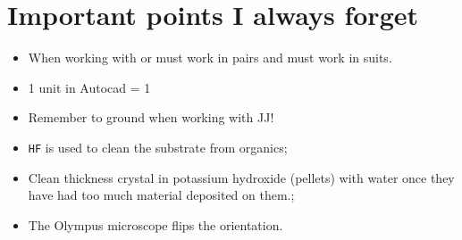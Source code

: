 \documentclass{phd_class}%
\begin{document}
\section*{Important points I always forget}\label{sec:important-points-i}

\begin{itemize}
\item When working with  or  must work in pairs and must
  work in suits.
\item 1 unit in Autocad = 1\mum
\item Remember to ground when working with JJ!
\item \texttt{HF} is used to clean the substrate from organics;
\item Clean thickness crystal in  potassium hydroxide (pellets) with water once
  they have had too much material deposited on them.;
\item The Olympus microscope flips the orientation.
\end{itemize}



\setcounter{tocdepth}{1}%
\tableofcontents%
\newpage%

%
%
%
%
%
%
%
%
%
%
%
%
%
%
%
%
%
%
%
%
%
%
%
%
%
%
%
%
%
%
%
%
%
%
%
%
%
%
%
%
%
%
%
%
%
%
%
%
%
%
\end{document}
